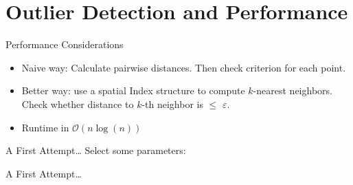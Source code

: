 \documentclass{beamer}
\begin{document}
\section{Outlier Detection and Performance}
\begin{frame}{Performance Considerations}
    \begin{itemize}
        \item Naive way: Calculate pairwise distances. Then check criterion for each point.
        \item Better way: use a spatial Index structure to compute $k$-nearest neighbors. Check whether distance to $k$-th neighbor is $\leq$ $\varepsilon$.
        \item Runtime in $\mathcal{O}(n\log(n))$
    \end{itemize}
\end{frame}
\begin{frame}{A First Attempt\ldots}
    Select some parameters: 
    \begin{center}
    \end{center}
\end{frame}{A First Attempt\ldots}
\end{document}

